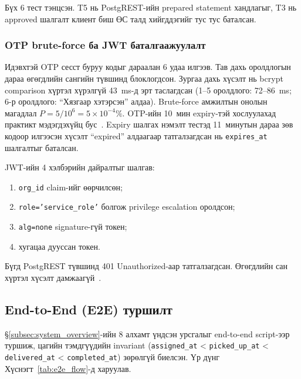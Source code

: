 Бүх 6 тест тэнцсэн. T5 нь PostgREST-ийн prepared statement хандлагыг, T3 нь approved шалгалт клиент биш ӨС талд хийгддэгийг тус тус баталсан.

\subsubsection{OTP brute-force ба JWT баталгаажуулалт}

Идэвхтэй OTP сесст буруу кодыг дараалан 6 удаа илгээв. Тав дахь оролдлогын дараа өгөгдлийн сангийн түвшинд блоклогдсон. Зургаа дахь хүсэлт нь bcrypt comparison хүртэл хүрэлгүй 43~ms-д эрт таслагдсан (1--5 оролдлого: 72--86~ms; 6-р оролдлого: ``Хязгаар хэтэрсэн'' алдаа). Brute-force амжилтын онолын магадлал $P = 5/10^6 = 5 \times 10^{-4}\%$. OTP-ийн 10~мин expiry-тэй хослуулахад практикт мэдэгдэхүйц бус~\cite{owasp2024authcheatsheet}. Expiry шалгах нэмэлт тестэд 11~минутын дараа зөв кодоор илгээсэн хүсэлт ``expired'' алдаагаар татгалзагдсан нь \texttt{expires\_at} шалгалтыг баталсан.

JWT-ийн 4 хэлбэрийн дайралтыг шалгав:
\begin{enumerate}
  \item \texttt{org\_id} claim-ийг өөрчилсөн;
  \item \texttt{role='service\_role'} болгож privilege escalation оролдсон;
  \item \texttt{alg=none} signature-гүй токен;
  \item хугацаа дууссан токен.
\end{enumerate}
Бүгд PostgREST түвшинд 401 Unauthorized-аар татгалзагдсан. Өгөгдлийн сан хүртэл хүсэлт дамжаагүй~\cite{jones2015jwt}.

\subsection{End-to-End (E2E) туршилт}
\label{subsec:functional_test}

\S\ref{subsec:system_overview}-ийн 8 алхамт үндсэн урсгалыг end-to-end script-ээр туршиж, цагийн тэмдгүүдийн invariant (\texttt{assigned\_at} < \texttt{picked\_up\_at} < \texttt{delivered\_at} < \texttt{completed\_at}) зөрөлгүй биелсэн. Үр дүнг Хүснэгт~\ref{tab:e2e_flow}-д харуулав.

